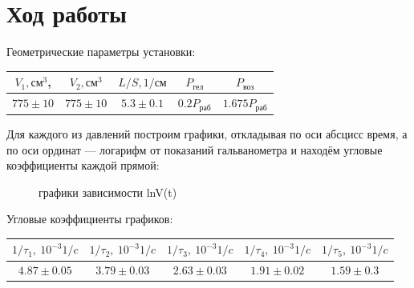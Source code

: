 \documentclass[a4paper, 12pt]{article}%
\begin{document}
\section{Ход работы}
Геометрические параметры установки:
\\
\begin{center}
\begin{tabular}{|c|c|c|c|c|}
\hline $V_1, \text{см}^3$, & $V_2, \text{см}^3$ & $L/S, 1/\text{см}$ &
$P_{\text{гел}}$ & $P_{\text{воз}}$ \\
\hline $775 \pm 10$ & $775 \pm 10$ & $5.3 \pm 0.1$ & $0.2 P_{\text{раб}}$ & $1.675 P_{\text{раб}}$ \\ \hline
\end{tabular}
\end{center}
Для каждого из давлений построим графики, откладывая по оси абсцисс время, а по оси ординат --- логарифм от показаний гальванометра и находём угловые коэффициенты каждой прямой:
\begin{figure}[h]
	\caption{графики зависимости lnV(t)}
\end{figure}
\linebreak
Угловые коэффициенты графиков:
\begin{center}

\begin{tabular}{|c|c|c|c|c|}
\hline $1/\tau_1,\ 10^{-3} 1/c$ & $1/\tau_2,\ 10^{-3} 1/c$ & $1/\tau_3,\  10^{-3} 1/c$ & $1/\tau_4,\ 10^{-3} 1/c$ & $1/\tau_5,\ 10^{-3} 1/c$ \\
\hline $4.87 \pm 0.05$ & $3.79 \pm 0.03$ & $2.63 \pm 0.03$ &  $1.91 \pm 0.02$ & $1.59 \pm 0.3$ \\\hline
	\end{tabular}
\end{center}
\end{document}

